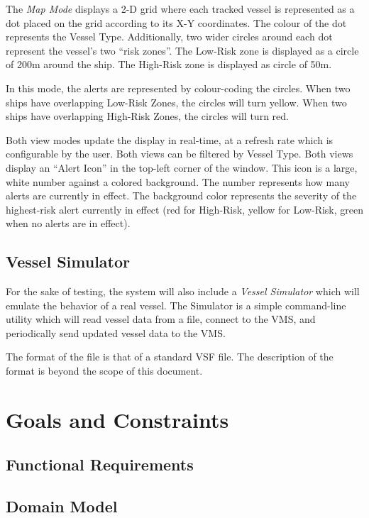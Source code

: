 \documentclass{article}
\begin{document}
The \emph{Map Mode} displays a 2-D grid where each tracked vessel is represented as a dot placed on the grid according to its X-Y coordinates. The colour of the dot represents the Vessel Type. Additionally, two wider circles around each dot represent the vessel's two ``risk zones''. The Low-Risk zone is displayed as a circle of 200m around the ship. The High-Risk zone is displayed as circle of 50m.

In this mode, the alerts are represented by colour-coding the circles. When two ships have overlapping Low-Risk Zones, the circles will turn yellow. When two ships have overlapping High-Risk Zones, the circles will turn red.

Both view modes update the display in real-time, at a refresh rate which is configurable by the user. Both views can be filtered by Vessel Type. Both views display an ``Alert Icon'' in the top-left corner of the window. This icon is a large, white number against a colored background. The number represents how many alerts are currently in effect. The background color represents the severity of the highest-risk alert currently in effect (red for High-Risk, yellow for Low-Risk, green when no alerts are in effect).

\subsection{Vessel Simulator}

For the sake of testing, the system will also include a \emph{Vessel Simulator} which will emulate the behavior of a real vessel. The Simulator is a simple command-line utility which will read vessel data from a file, connect to the VMS, and periodically send updated vessel data to the VMS.

The format of the file is that of a standard VSF file. The description of the format is beyond the scope of this document.

\section{Goals and Constraints} %

\subsection{Functional Requirements} %

\subsection{Domain Model} %
\end{document}
